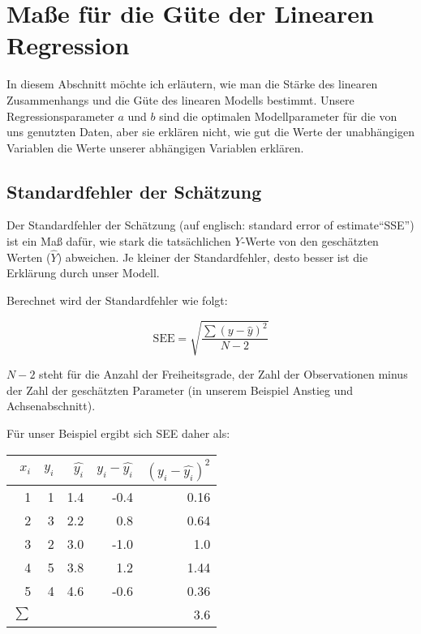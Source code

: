 \documentclass[ngerman, 12pt]{scrartcl}
\begin{document}
\section{Maße für die Güte der Linearen Regression}

In diesem Abschnitt möchte ich erläutern, wie man die Stärke des linearen Zusammenhangs und die Güte des linearen Modells bestimmt. Unsere Regressionsparameter \(a\) und \(b\) sind die optimalen Modellparameter für die von uns genutzten Daten, aber sie erklären nicht, wie gut die Werte der unabhängigen Variablen die Werte unserer abhängigen Variablen erklären.

\subsection{Standardfehler der Schätzung}

Der Standardfehler der Schätzung (auf englisch: standard error of estimate\enquote{SSE}) ist ein Maß dafür, wie stark die tatsächlichen \(Y\)-Werte von den geschätzten Werten (\(\hat{Y}\)) abweichen. Je kleiner der Standardfehler, desto besser ist die Erklärung durch unser Modell. 

Berechnet wird der Standardfehler wie folgt:

\begin{equation}
\text{SEE} = \sqrt{\frac{\sum (y-\hat{y})^2}{N-2}}
\end{equation}

\(N-2\) steht für die Anzahl der Freiheitsgrade, der Zahl der Observationen minus der Zahl der geschätzten Parameter (in unserem Beispiel Anstieg und Achsenabschnitt).

Für unser Beispiel ergibt sich SEE daher als:

\begin{center}
\begin{tabular}{r|rrrr} \toprule
\(x_i\) & \(y_i\)  & \(\hat{y_i}\) & \(y_i-\hat{y_i}\) & \((y_i-\hat{y_i})^2\) \\ \midrule
1 & 1 & 1.4 & -0.4 & 0.16 \\
2 & 3 & 2.2 & 0.8 & 0.64 \\
3 & 2 & 3.0 & -1.0  & 1.0	\\
4 & 5 & 3.8 & 1.2 & 1.44\\
5 & 4 & 4.6 &  -0.6 & 0.36\\ \midrule
\(\sum\) & & & & 3.6 \\ \bottomrule
\end{tabular}
\end{center}
\end{document}
